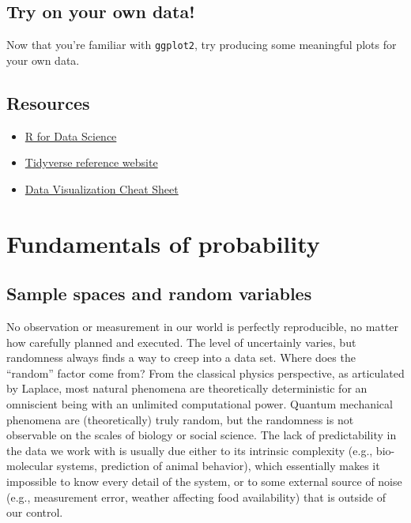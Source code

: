 \documentclass[
  letterpaper,
  DIV=11,
  numbers=noendperiod]{scrreprt}
\providecommand{\tightlist}{%
  \setlength{\itemsep}{0pt}\setlength{\parskip}{0pt}}\usepackage{longtable,booktabs,array}
\begin{document}
\section{Try on your own data!}\label{try-on-your-own-data}

Now that you're familiar with \texttt{ggplot2}, try producing some
meaningful plots for your own data.

\section{Resources}\label{resources-1}

\begin{itemize}
\tightlist
\item
  \href{https://hackr.io/tutorial/r-for-data-science}{R for Data
  Science}
\item
  \href{https://www.tidyverse.org/}{Tidyverse reference website}
\item
  \href{https://github.com/rstudio/cheatsheets/raw/master/data-visualization-2.1.pdf}{Data
  Visualization Cheat Sheet}
\end{itemize}


\chapter{Fundamentals of probability}\label{fundamentals-of-probability}

\section{Sample spaces and random
variables}\label{sample-spaces-and-random-variables}

No observation or measurement in our world is perfectly reproducible, no
matter how carefully planned and executed. The level of uncertainly
varies, but randomness always finds a way to creep into a data set.
Where does the ``random'' factor come from? From the classical physics
perspective, as articulated by Laplace, most natural phenomena are
theoretically deterministic for an omniscient being with an unlimited
computational power. Quantum mechanical phenomena are (theoretically)
truly random, but the randomness is not observable on the scales of
biology or social science. The lack of predictability in the data we
work with is usually due either to its intrinsic complexity (e.g.,
bio-molecular systems, prediction of animal behavior), which essentially
makes it impossible to know every detail of the system, or to some
external source of noise (e.g., measurement error, weather affecting
food availability) that is outside of our control.
\end{document}
